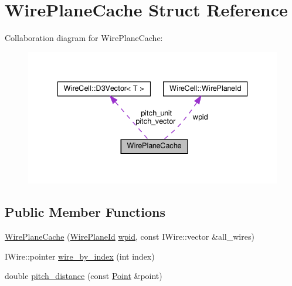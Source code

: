 \hypertarget{struct_wire_plane_cache}{}\section{Wire\+Plane\+Cache Struct Reference}
\label{struct_wire_plane_cache}


Collaboration diagram for Wire\+Plane\+Cache\+:
\nopagebreak
\begin{figure}[H]
\begin{center}
\leavevmode
\includegraphics[width=336pt]{struct_wire_plane_cache__coll__graph}
\end{center}
\end{figure}
\subsection*{Public Member Functions}
\begin{DoxyCompactItemize}
\item 
\hyperlink{struct_wire_plane_cache_a2cefdea150e8bbd0eb82a2efdca9bbf4}{Wire\+Plane\+Cache} (\hyperlink{class_wire_cell_1_1_wire_plane_id}{Wire\+Plane\+Id} \hyperlink{struct_wire_plane_cache_a253233f47cbf5ece1ba3ece1a211b8c4}{wpid}, const I\+Wire\+::vector \&all\+\_\+wires)
\item 
I\+Wire\+::pointer \hyperlink{struct_wire_plane_cache_a96ab540b1fb5007eabd540fbae44cc62}{wire\+\_\+by\+\_\+index} (int index)
\item 
double \hyperlink{struct_wire_plane_cache_a01c8f094e36bf466517df1b9b4ee071d}{pitch\+\_\+distance} (const \hyperlink{namespace_wire_cell_ab2b2565fa6432efbb4513c14c988cda9}{Point} \&point)
\end{DoxyCompactItemize}

